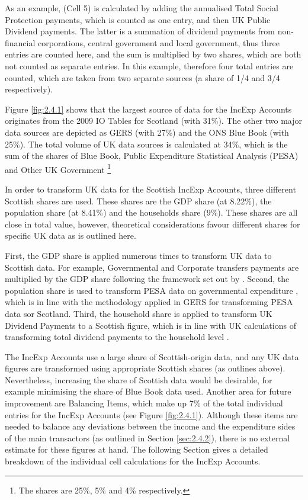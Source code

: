 As an example, (Cell 5) is calculated by adding the annualised Total Social Protection payments, which is counted as one entry, and then UK Public Dividend payments. The latter is a summation of dividend payments from non-financial corporations, central government and local government, thus three entries are counted here, and the sum is multiplied by two shares, which are both not counted as separate entries. In this example, therefore four total entries are counted, which are taken from two separate sources (a share of 1/4 and 3/4 respectively).

\bigskip

Figure \ref{fig:2.4.1} shows that the largest source of data for the IncExp Accounts originates from the 2009 IO Tables for Scotland (with 31\%). The other two major data sources are depicted as GERS (with 27\%) and the ONS Blue Book (with 25\%). The total volume of UK data sources is calculated at 34\%, which is the sum of the shares of Blue Book, Public Expenditure Statistical Analysis (PESA) and Other UK Government \footnote{The shares are 25\%, 5\% and 4\% respectively.}

\bigskip

In order to transform UK data for the Scottish IncExp Accounts, three different Scottish shares are used. These shares are the GDP share (at 8.22\%), the population share (at 8.41\%) and the households share (9\%). These shares are all close in total value, however, theoretical considerations favour different shares for specific UK data as is outlined here. 

\bigskip

First, the GDP share is applied numerous times to transform UK data to Scottish data. For example, Governmental and Corporate transfers payments \cite{ONS2011c} are multiplied by the GDP share following the framework set out by \cite{Hermannsson2010a}. Second, the population share is used to transform PESA data on governmental expenditure \cite{HMTR2012}, which is in line with the methodology applied in GERS \cite{ScotGov2013b} for transforming PESA data sor Scotland. Third, the household share is applied to transform UK Dividend Payments to a Scottish figure, which is in line with UK calculations of transforming total dividend payments to the household level \cite{ONS2011c}.

\bigskip

The IncExp Accounts use a large share of Scottish-origin data, and any UK data figures are transformed using appropriate Scottish shares (as outlines above). Nevertheless, increasing the share of Scottish data would be desirable, for example minimising the share of Blue Book \cite{ONS2011c} data used. Another area for future improvement are Balancing Items, which make up 7\% of the total individual entries for the IncExp Accounts (see Figure \ref{fig:2.4.1}). Although these items are needed to balance any deviations between the income and the expenditure sides of the main transactors (as outlined in Section \ref{sec:2.4.2}), there is no external estimate for these figures at hand. The following Section gives a detailed breakdown of the individual cell calculations for the IncExp Accounts.


